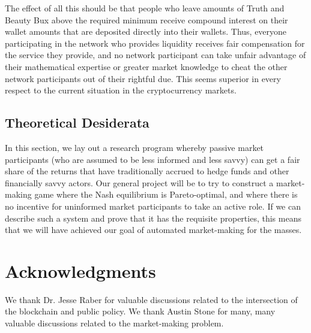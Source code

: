 \documentclass{article}
\begin{document}
The effect of all this should be that people who leave amounts of
Truth and Beauty Bux above the required minimum receive compound
interest on their wallet amounts that are deposited directly into
their wallets. Thus, everyone participating in the network who
provides liquidity receives fair compensation for the service they
provide, and no network participant can take unfair advantage of their
mathematical expertise or greater market knowledge to cheat the other
network participants out of their rightful due. This seems superior in
every respect to the current situation in the cryptocurrency markets.

\subsection{Theoretical Desiderata}

In this section, we lay out a research program whereby passive market
participants (who are assumed to be less informed and less savvy) can
get a fair share of the returns that have traditionally accrued to
hedge funds and other financially savvy actors. Our general project
will be to try to construct a market-making game where the Nash
equilibrium is Pareto-optimal, and where there is no incentive for
uninformed market participants to take an active role. If we can
describe such a system and prove that it has the requisite properties,
this means that we will have achieved our goal of automated
market-making for the masses.

\section{Acknowledgments}

We thank Dr. Jesse Raber for valuable discussions related to the
intersection of the blockchain and public policy. We thank Austin
Stone for many, many valuable discussions related to the market-making
problem.
\end{document}
